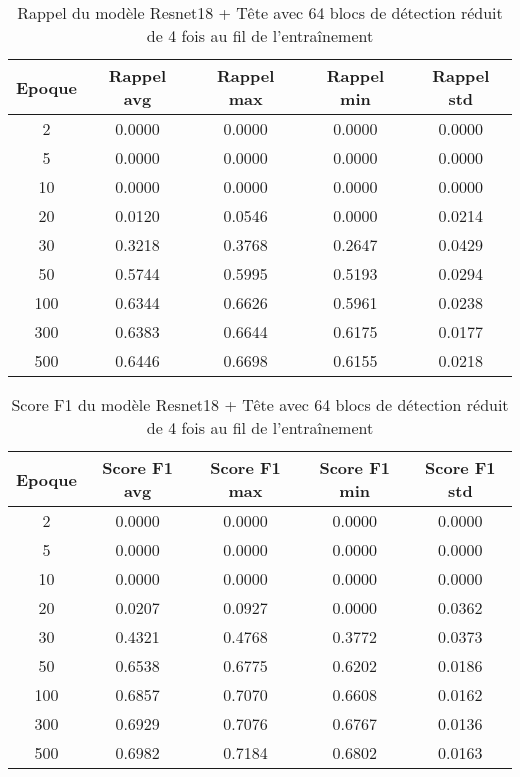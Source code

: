 \begin{table}[!ht]
    \caption{Rappel du modèle Resnet18 + Tête avec 64 blocs de détection réduit de 4 fois au fil de l'entraînement}
    \label{tab:resnet18+head_64n_reduced_4x_rappel}
    \centering
    \begin{tabular}{ |c||c|c|c|c|  }
        \hline
        \rowcolor{gray!50}
        Epoque & Rappel avg & Rappel max & Rappel min & Rappel std\\
        \hline
        2 & 0.0000 & 0.0000 & 0.0000 & 0.0000\\
        5 & 0.0000 & 0.0000 & 0.0000 & 0.0000\\
        10 & 0.0000 & 0.0000 & 0.0000 & 0.0000\\
        20 & 0.0120 & 0.0546 & 0.0000 & 0.0214\\
        30 & 0.3218 & 0.3768 & 0.2647 & 0.0429\\
        50 & 0.5744 & 0.5995 & 0.5193 & 0.0294\\
        100 & 0.6344 & 0.6626 & 0.5961 & 0.0238\\
        300 & 0.6383 & 0.6644 & 0.6175 & 0.0177\\
        500 & 0.6446 & 0.6698 & 0.6155 & 0.0218\\
        \hline
    \end{tabular}
\end{table}

\begin{table}[!ht]
    \caption{Score F1 du modèle Resnet18 + Tête avec 64 blocs de détection réduit de 4 fois au fil de l'entraînement}
    \label{tab:resnet18+head_64n_reduced_4x_f1score}
    \centering
    \begin{tabular}{ |c||c|c|c|c|  }
        \hline
        \rowcolor{gray!50}
        Epoque & Score F1 avg & Score F1 max & Score F1 min & Score F1 std\\
        \hline
        2 & 0.0000 & 0.0000 & 0.0000 & 0.0000\\
        5 & 0.0000 & 0.0000 & 0.0000 & 0.0000\\
        10 & 0.0000 & 0.0000 & 0.0000 & 0.0000\\
        20 & 0.0207 & 0.0927 & 0.0000 & 0.0362\\
        30 & 0.4321 & 0.4768 & 0.3772 & 0.0373\\
        50 & 0.6538 & 0.6775 & 0.6202 & 0.0186\\
        100 & 0.6857 & 0.7070 & 0.6608 & 0.0162\\
        300 & 0.6929 & 0.7076 & 0.6767 & 0.0136\\
        500 & 0.6982 & 0.7184 & 0.6802 & 0.0163\\
        \hline
    \end{tabular}
\end{table}

